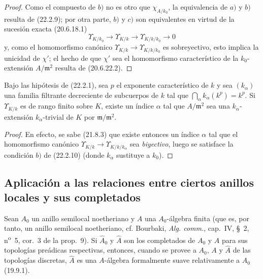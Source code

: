 \begin{proof}
Como el compuesto de $b)$ no es otro que $\chi_{A/k_0}$, la equivalencia de
$a)$ y $b)$ resulta de (22.2.9); por otra parte, $b)$ y $c)$ son equivalentes
en virtud de
la sucesión exacta (20.6.18.1)
\[
  \Upsilon_{K/k_0}\longrightarrow\Upsilon_{K/k}
  \longrightarrow\Upsilon_{K/k/k_0}\longrightarrow0
\]
y, como el homomorfismo canónico
$\Upsilon_{K/k}\to\Upsilon_{K/k/k_0}$ es sobreyectivo, esto implica la
unicidad de $\chi'$; el hecho de que $\chi'$ sea el homomorfismo característico
de la $k_0$-extensión $A/\mathfrak m^2$ resulta de (20.6.22.2).
\end{proof}

\begin{corollary}[22.2.11]
\label{0.22.2.11-fr}
Bajo las hipótesis de \textup{(22.2.1)}, sea $p$ el exponente característico de $k$ y
sea $(k_\alpha)$ una familia filtrante decreciente de subcuerpos de $k$ tal
que $\bigcap_\alpha k_\alpha(k^p)=k^p$. Si $\Upsilon_{K/k}$ es de rango finito
sobre $K$, existe un índice $\alpha$ tal que $A/\mathfrak m^2$ sea una
$k_\alpha$-extensión $k_\alpha$-trivial de $K$ por
$\mathfrak m/\mathfrak m^2$.
\end{corollary}

\begin{proof}
En efecto, se sabe (21.8.3) que existe entonces un índice $\alpha$ tal que el
homomorfismo canónico $\Upsilon_{K/k}\to\Upsilon_{K/k/k_\alpha}$ sea
\emph{biyectivo}, luego se satisface la condición $b)$ de (22.2.10) (donde $k_\alpha$
sustituye a $k_0$).
\end{proof}


\subsection{Aplicación a las relaciones entre ciertos anillos locales y sus completados}
\label{subsection:0.22.3-fr}

\begin{lemma}[22.3.1]
\label{0.22.3.1-fr}
Sean $A_0$ un anillo semilocal noetheriano y $A$ una $A_0$-álgebra finita
(que es, por tanto, un anillo semilocal noetheriano, \textup{cf. Bourbaki,
\emph{Alg. comm.}, cap.~IV, §~2, n\textsuperscript{o}~5, cor.~3 de la
prop.~9)}. Si $\widehat A_0$ y $\widehat A$ son los completados de $A_0$ y $A$
para sus topologías preádicas respectivas, entonces, cuando se provee a
$A_0$, $A$ y $\widehat A$ de las topologías \textup{discretas}, $\widehat A$ es una
$A$-álgebra formalmente suave relativamente a $A_0$ \textup{(19.9.1)}.
\end{lemma}

